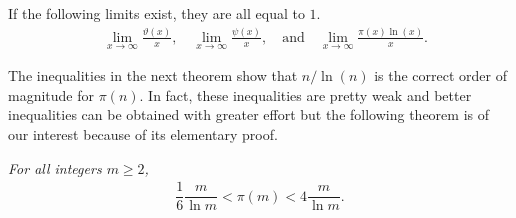 	\begin{theorem}
		\label{thm:chebyshevestimates}
		If the following limits exist, they are all equal to $1$.
		\begin{align}
			&\lim_{x \to \infty} \frac{\vartheta(x)}{x}, \quad \lim_{x \to \infty} \frac{\psi(x)}{x}, \quad \text{and} \quad 
			\lim_{x \to \infty} \frac{\pi(x) \ln(x)}{x}. \label{eq:chebyshevestimates:eq1}					
		\end{align}
	\end{theorem}


The inequalities in the next theorem show that $n/\ln(n)$ is the correct order of magnitude for $\pi(n)$. In fact, these inequalities are pretty weak and better inequalities can be obtained with greater effort but the following theorem is of our interest because of its elementary proof.

	\begin{theorem}\slshape
	\label{thm:pi(n)approximation}
		For all integers $m\geq2$, 
		\begin{align}
		\label{eq:pi(n)approximation:0}
		\dfrac{1}{6}\dfrac{m}{\ln m}<\pi(m)<4\dfrac{m}{\ln m}.
		\end{align}
	\end{theorem}
	
